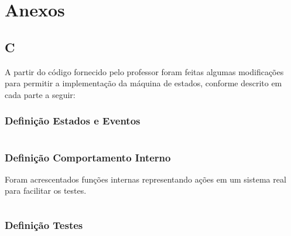 \documentclass[a4paper,11pt]{article}
\begin{document}
\newpage
\section*{Anexos}



\subsection*{C}

A partir do código fornecido pelo professor foram feitas algumas modificações para permitir a implementação da máquina de estados, conforme descrito em cada parte a seguir:

\subsubsection*{Definição Estados e Eventos}
\inputminted[xleftmargin=15pt,linenos,frame=single,framesep=5pt,breaklines=true]{c}{../c/state_machine/inc/state_machine.h}

\newpage
\subsubsection*{Definição Comportamento Interno}
Foram acrescentados funções internas representando ações em um sistema real para facilitar os testes.
\inputminted[xleftmargin=15pt,linenos,frame=single,framesep=5pt,breaklines=true]{c}{../c/state_machine/src/state_machine.c}

\newpage
\subsubsection*{Definição Testes}
\inputminted[xleftmargin=15pt,linenos,frame=single,framesep=5pt,breaklines=true]{c}{../c/state_machine/src/test_1.c}

\newpage
\end{document}
